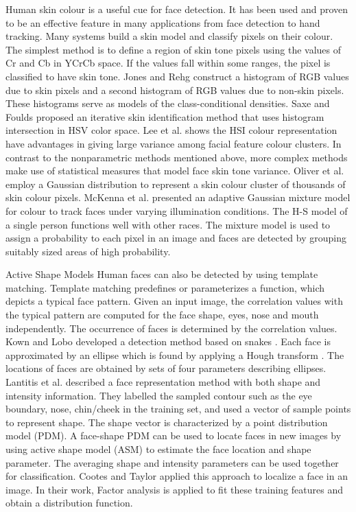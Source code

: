 Human skin colour is a useful cue for face detection. It has been used and proven to be an effective feature in many applications from face detection to hand tracking. Many systems build a skin model and classify pixels on their colour. The simplest method \cite{} is to define a region of skin tone pixels using the values of Cr and Cb in YCrCb space. If the values fall within some ranges, the pixel is classified to have skin tone. Jones and Rehg \cite{} construct a histogram of RGB values due to skin pixels and a second histogram of RGB values due to non-skin pixels. These histograms serve as models of the class-conditional densities. Saxe and Foulds \cite{} proposed an iterative skin identification method that uses histogram intersection in HSV color space. Lee et al. \cite{} shows the HSI colour representation have advantages in giving large variance among facial feature colour clusters. In contrast to the nonparametric methods mentioned above, more complex methods make use of statistical measures that model face skin tone variance. Oliver et al. \cite{} employ a Gaussian distribution to represent a skin colour cluster of thousands of skin colour pixels. McKenna et al. \cite{} presented an adaptive Gaussian mixture model for colour to track faces under varying illumination conditions. The H-S model of a single person functions well with other races. The mixture model is used to assign a probability to each pixel in an image and faces are detected by grouping suitably sized areas of high probability.

Active Shape Models
Human faces can also be detected by using template matching. Template matching predefines or parameterizes a function, which depicts a typical face pattern. Given an input image, the correlation values with the typical pattern are computed for the face shape, eyes, nose and mouth independently. The occurrence of faces is determined by the correlation values. Kown and Lobo \cite{} developed a detection method based on snakes \cite{}. Each face is approximated by an ellipse which is found by applying a Hough transform \cite{}. The locations of faces are obtained by sets of four parameters describing ellipses. Lantitis et al. \cite{} described a face representation method with both shape and intensity information. They labelled the sampled contour such as the eye boundary, nose, chin/cheek in the training set, and used a vector of sample points to represent shape. The shape vector is characterized by a point distribution model (PDM). A face-shape PDM can be used to locate faces in new images by using active shape model (ASM) to estimate the face location and shape parameter. The averaging shape and intensity parameters can be used together for classification. Cootes and Taylor \cite{} applied this approach to localize a face in an image. In their work, Factor analysis \cite{} is applied to fit these training features and obtain a distribution function. 

